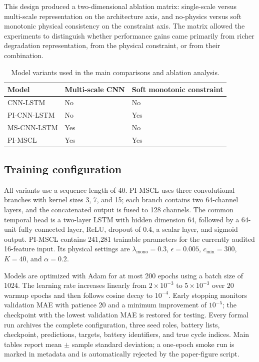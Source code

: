 \documentclass[a4paper,fleqn]{cas-dc}
\begin{document}
This design produced a two-dimensional ablation matrix: single-scale versus multi-scale representation on the architecture axis, and no-physics versus soft monotonic physical consistency on the constraint axis. The matrix allowed the experiments to distinguish whether performance gains came primarily from richer degradation representation, from the physical constraint, or from their combination.

\begin{table}[t]
\caption{Model variants used in the main comparisons and ablation analysis.}
\label{tab:model_variants}
\centering
\begin{tabular}{lll}
\toprule
Model & Multi-scale CNN & Soft monotonic constraint \\
\midrule
CNN-LSTM & No & No \\
PI-CNN-LSTM & No & Yes \\
MS-CNN-LSTM & Yes & No \\
PI-MSCL & Yes & Yes \\
\bottomrule
\end{tabular}
\end{table}

\subsection{Training configuration}
\label{subsec:training_config}

All variants use a sequence length of 40. PI-MSCL uses three convolutional branches with kernel sizes 3, 7, and 15; each branch contains two 64-channel layers, and the concatenated output is fused to 128 channels. The common temporal head is a two-layer LSTM with hidden dimension 64, followed by a 64-unit fully connected layer, ReLU, dropout of 0.4, a scalar layer, and sigmoid output. PI-MSCL contains 241,281 trainable parameters for the currently audited 16-feature input. Its physical settings are $\lambda_{\mathrm{mono}}=0.3$, $\epsilon=0.005$, $c_{\min}=300$, $K=40$, and $\alpha=0.2$.

Models are optimized with Adam for at most 200 epochs using a batch size of 1024. The learning rate increases linearly from $2\times10^{-3}$ to $5\times10^{-3}$ over 20 warmup epochs and then follows cosine decay to $10^{-4}$. Early stopping monitors validation MAE with patience 20 and a minimum improvement of $10^{-5}$; the checkpoint with the lowest validation MAE is restored for testing. Every formal run archives the complete configuration, three seed roles, battery lists, checkpoint, predictions, targets, battery identifiers, and true cycle indices. Main tables report mean $\pm$ sample standard deviation; a one-epoch smoke run is marked in metadata and is automatically rejected by the paper-figure script.
\end{document}

